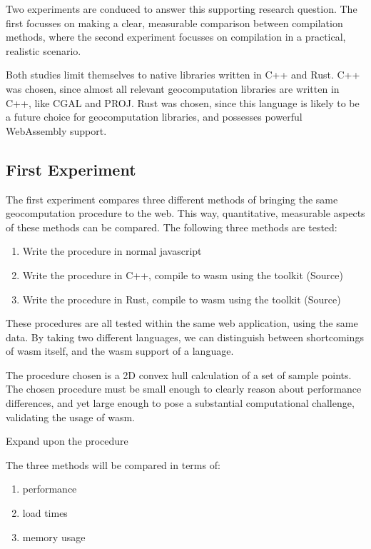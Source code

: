 Two experiments are conduced to answer this supporting research question. 
The first focusses on making a clear, measurable comparison between compilation methods, where the second experiment focusses on compilation in a practical, realistic scenario. 

Both studies limit themselves to native libraries written in C++ and Rust. 
C++ was chosen, since almost all relevant geocomputation libraries are written in C++, like CGAL and PROJ. 
Rust was chosen, since this language is likely to be a future choice for geocomputation libraries, and possesses powerful WebAssembly support. 


\subsection{First Experiment}
The first experiment compares three different methods of bringing the same geocomputation procedure to the web. 
This way, quantitative, measurable aspects of these methods can be compared. 
The following three methods are tested:
\begin{enumerate}[-]
  \item Write the procedure in normal javascript
  \item Write the procedure in C++, compile to wasm using the  toolkit (Source)
  \item Write the procedure in Rust, compile to wasm using the  toolkit (Source)
\end{enumerate}
These procedures are all tested within the same web application, using the same data. 
By taking two different languages, we can distinguish between shortcomings of \ac{wasm} itself, and the \ac{wasm} support of a language.  

The procedure chosen is a 2D convex hull calculation of a set of sample points. 
The chosen procedure must be small enough to clearly reason about performance differences, and yet large enough to pose a substantial computational challenge, validating the usage of \ac{wasm}.

\begin{note}
  Expand upon the procedure
\end{note}

The three methods will be compared in terms of:
\begin{enumerate}[-]
  \item performance
  \item load times
  \item memory usage
\end{enumerate}

